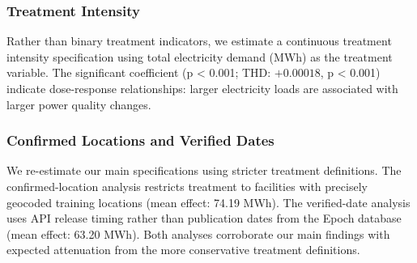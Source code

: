 \documentclass[a4paper,fleqn,longmktitle]{cas-sc}
\begin{document}
\subsubsection{Treatment Intensity}

Rather than binary treatment indicators, we estimate a continuous treatment intensity specification using total electricity demand (MWh) as the treatment variable. The significant coefficient (p < 0.001; THD: $+0.00018$, p < 0.001) indicate dose-response relationships: larger electricity loads are associated with larger power quality changes.

\subsubsection{Confirmed Locations and Verified Dates}

We re-estimate our main specifications using stricter treatment definitions. The confirmed-location analysis restricts treatment to facilities with precisely geocoded training locations (mean effect: 74.19 MWh). The verified-date analysis uses API release timing rather than publication dates from the Epoch database (mean effect: 63.20 MWh). Both analyses corroborate our main findings with expected attenuation from the more conservative treatment definitions.
\end{document}
